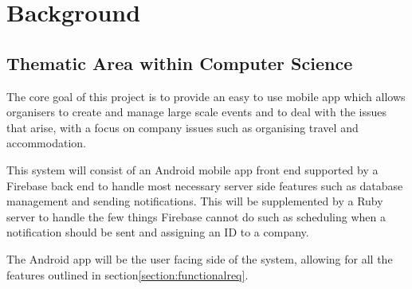 \chapter{Background}
\label{chap:background}


\section{Thematic Area within Computer Science}
\label{thematicarea}


The core goal of this project is to provide an easy to use mobile app which allows organisers to create and manage large scale events and to deal with the issues that arise, with a focus on company issues such as organising travel and accommodation.

This system will consist of an Android mobile app front end supported by a Firebase back end to handle most necessary server side features such as database management and sending notifications. This will be supplemented by a Ruby server to handle the few things Firebase cannot do such as scheduling when a notification should be sent and assigning an ID to a company.

The Android app will be the user facing side of the system, allowing for all the features outlined in section\ref{section:functionalreq}.

